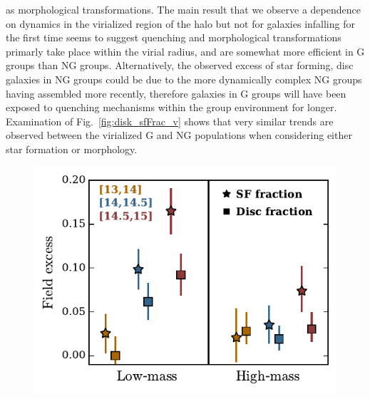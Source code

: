 \documentclass[a4paper,fleqn,usenatbib]{mnras}
\begin{document}
as morphological transformations.  The main result that we observe a
dependence on dynamics in the virialized region of the halo but not
for galaxies infalling for the first time seems to suggest quenching and
morphological transformations primarly take
place within the virial radius, and are somewhat more efficient in G
groups than NG groups.  Alternatively, the observed excess of star
forming, disc galaxies in NG groups could be due to the more
dynamically complex NG groups having assembled more recently,
therefore galaxies in G groups will have been exposed to quenching
mechanisms within the group environment for longer.  Examination of
Fig.~\ref{fig:disk_sfFrac_v} shows that very similar trends are observed
between the virialized G and NG populations when considering either
star formation or morphology.

\begin{figure}
  \centering
  \includegraphics[width=\columnwidth]{pp_mh.pdf}
  \caption{}
  \label{fig:pp_mh}
\end{figure}
\end{document}
